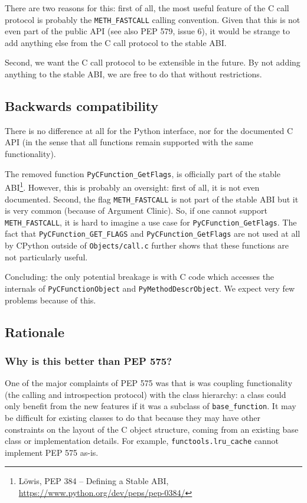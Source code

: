 There are two reasons for this: first of all, the most useful feature of
the C call protocol is probably the \texttt{METH\_FASTCALL} calling
convention. Given that this is not even part of the public API (see also
PEP 579, issue 6), it would be strange to add anything else from the C
call protocol to the stable ABI.

Second, we want the C call protocol to be extensible in the future. By
not adding anything to the stable ABI, we are free to do that without
restrictions.

\subsection{Backwards compatibility}

There is no difference at all for the Python interface, nor for the
documented C API (in the sense that all functions remain supported with
the same functionality).

The removed function \texttt{PyCFunction\_GetFlags}, is officially part
of the stable ABI\footnote{Löwis, PEP 384 -- Defining a Stable ABI,
  \url{https://www.python.org/dev/peps/pep-0384/}}. However, this is
probably an oversight: first of all, it is not even documented. Second,
the flag \texttt{METH\_FASTCALL} is not part of the stable ABI but it is
very common (because of Argument Clinic). So, if one cannot support
\texttt{METH\_FASTCALL}, it is hard to imagine a use case for
\texttt{PyCFunction\_GetFlags}. The fact that
\texttt{PyCFunction\_GET\_FLAGS} and \texttt{PyCFunction\_GetFlags} are
not used at all by CPython outside of \texttt{Objects/call.c} further
shows that these functions are not particularly useful.

Concluding: the only potential breakage is with C code which accesses
the internals of \texttt{PyCFunctionObject} and
\texttt{PyMethodDescrObject}. We expect very few problems because of
this.

\subsection{Rationale}

\subsubsection{Why is this better than PEP 575?}

One of the major complaints of PEP 575 was that is was coupling
functionality (the calling and introspection protocol) with the class
hierarchy: a class could only benefit from the new features if it was a
subclass of \texttt{base\_function}. It may be difficult for existing
classes to do that because they may have other constraints on the layout
of the C object structure, coming from an existing base class or
implementation details. For example, \texttt{functools.lru\_cache}
cannot implement PEP 575 as-is.

